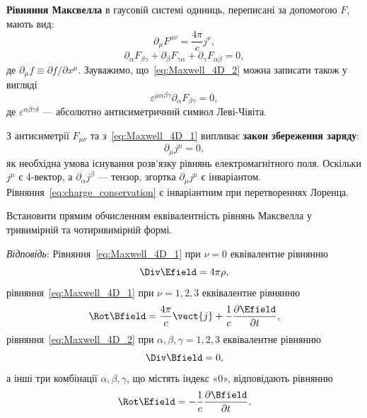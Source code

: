 \textbf{Рівняння Максвелла} в гаусовій системі одиниць, переписані за допомогою $F$,
мають вид:
\begin{equation}\label{eq:Maxwell_4D_1}
    \partial_{\mu}F^{\mu\nu} = \frac{4\pi}{c}j^{\nu},
\end{equation}
\begin{equation}\label{eq:Maxwell_4D_2}
    \partial_{\alpha}F_{\beta\gamma}
    + \partial_{\beta}F_{\gamma\alpha}
    + \partial_{\gamma}F_{\alpha\beta} = 0,
\end{equation}
де $\partial_{\mu}f \equiv \partial f/\partial x^{\mu}$. Зауважимо, що~\eqref{eq:Maxwell_4D_2} можна записати також у
вигляді
\begin{equation*}
    \varepsilon^{\mu\alpha\beta\gamma}\partial_{\alpha}F_{\beta\gamma} = 0,
\end{equation*}
де $\varepsilon^{\alpha\beta\gamma\delta}$ --- абсолютно антисиметричний символ Леві-Чівіта.

З антисиметрії $F_{\mu\nu}$ та з~\eqref{eq:Maxwell_4D_1} випливає \textbf{закон збереження заряду}:
\begin{equation}\label{eq:charge_conservation}
    \partial_{\mu}j^{\mu} = 0,
\end{equation}
як необхідна умова існування розв'язку рівнянь електромагнітного поля. Оскільки $j^{\mu}$ є 4-вектор, а
$\partial_{\alpha}j^{\beta}$ --- тензор, згортка $\partial_{\mu}j^{\mu}$ є інваріантом.
Рівняння~\eqref{eq:charge_conservation} є інваріантним при перетвореннях Лоренца.

\begin{problem}
    Встановити прямим обчисленням еквівалентність рівнянь Максвелла у тривимірній та чотиривимірній формі.

    \textit{Відповідь}: Рівняння~\eqref{eq:Maxwell_4D_1} при $\nu=0$ еквівалентне рівнянню
    \[
        \Div\Efield = 4\pi\rho,
    \]
    рівняння~\eqref{eq:Maxwell_4D_1} при $\nu=1,2,3$ еквівалентне рівнянню
    \[
        \Rot\Bfield = \frac{4\pi}{c}\vect{j}
        + \frac{1}{c}\frac{\partial\Efield}{\partial t},
    \]
    рівняння~\eqref{eq:Maxwell_4D_2} при $\alpha,\beta,\gamma=1,2,3$ еквівалентне рівнянню
    \[
        \Div\Bfield = 0,
    \]
    а інші три комбінації $\alpha,\beta,\gamma$, що містять індекс «0», відповідають рівнянню
    \[
        \Rot\Efield = -\frac{1}{c}\frac{\partial\Bfield}{\partial t}.
    \]
\end{problem}


